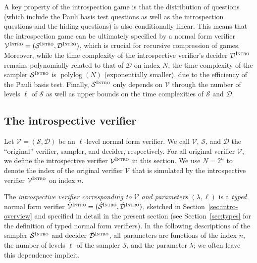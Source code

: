 \documentclass[11pt]{article}
\theoremstyle{definition}
\DeclareMathOperator{\polylog}{polylog}
\newcommand{\sampler}{\mathcal{S}}
\newcommand{\decider}{\mathcal{D}}
\newcommand{\verifier}{\mathcal{V}}
\newcommand{\gamestyle}[1]{\ensuremath{\textsc{#1}}\xspace}
\newcommand{\intro}{\gamestyle{Intro}}
\begin{document}
A key property of the introspection game is that the distribution of questions
(which include the Pauli basis test questions as well as the introspection
questions and the hiding questions) is also conditionally linear.
This means that the introspection game can be ultimately specified by a normal
form verifier $\verifier^\intro = (\sampler^\intro,\decider^\intro)$, which is
crucial for recursive compression of games.
Moreover, while the time complexity of the introspective verifier's decider
$\decider^\intro$ remains polynomially related to that of $\decider$ on index
$N$, the time complexity of the sampler $\sampler^\intro$ is $\polylog(N)$
(exponentially smaller), due to the efficiency of the Pauli basis test.
Finally, $\sampler^\intro$ only depends on $\verifier$ through the number of
levels $\ell$ of $\sampler$ as well as upper bounds on the time complexities of
$\sampler$ and $\decider$.

\subsection{The introspective verifier}
\label{sec:intro-verifier}

\def\tsint{\hat{\sampler}^\intro}
\def\tdint{\hat{\decider}^\intro}
\def\tvint{\hat{\verifier}^\intro}
\def\sint{\sampler^\intro}
\def\dint{\decider^\intro}
\def\vint{\verifier^\intro}

Let $\verifier = (\sampler, \decider)$ be an $\ell$-level normal form verifier.
We call $\verifier$, $\sampler$, and $\decider$ the ``original'' verifier,
sampler, and decider, respectively.
For all original verifier $\verifier$, we define the introspective verifier
$\vint$ in this section.
We use $N = 2^n$ to denote the index of the original verifier $\verifier$ that
is simulated by the introspective verifier $\vint$ on index $n$.





The \emph{introspective verifier corresponding to $\verifier$ and parameters
  $(\lambda,\ell)$} is a \emph{typed} normal form verifier $\tvint
=(\tsint, \tdint)$, sketched in
Section~\ref{sec:intro-overview} and specified in detail in the present section
(see Section~\ref{sec:types} for the definition of typed normal form verifiers).
In the following descriptions of the sampler $\tsint$ and decider
$\tdint$, all parameters are functions of the index $n$, the number of
levels $\ell$ of the sampler $\sampler$, and the parameter $\lambda$; we often
leave this dependence implicit.
\end{document}
